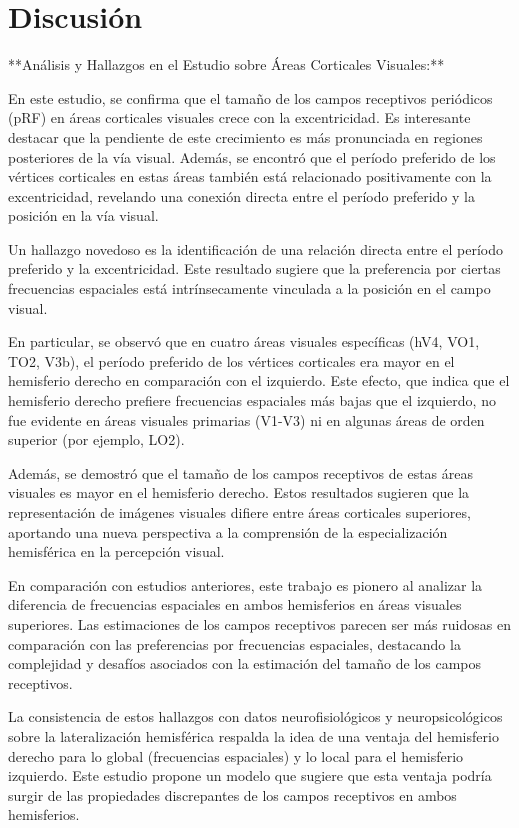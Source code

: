\chapter{Discusi\'on}\label{chapter:discussion}

**Análisis y Hallazgos en el Estudio sobre Áreas Corticales Visuales:**

En este estudio, se confirma que el tamaño de los campos receptivos periódicos (pRF) en áreas corticales visuales crece con la excentricidad. Es interesante destacar que la pendiente de este crecimiento es más pronunciada en regiones posteriores de la vía visual. Además, se encontró que el período preferido de los vértices corticales en estas áreas también está relacionado positivamente con la excentricidad, revelando una conexión directa entre el período preferido y la posición en la vía visual.

Un hallazgo novedoso es la identificación de una relación directa entre el período preferido y la excentricidad. Este resultado sugiere que la preferencia por ciertas frecuencias espaciales está intrínsecamente vinculada a la posición en el campo visual.

En particular, se observó que en cuatro áreas visuales específicas (hV4, VO1, TO2, V3b), el período preferido de los vértices corticales era mayor en el hemisferio derecho en comparación con el izquierdo. Este efecto, que indica que el hemisferio derecho prefiere frecuencias espaciales más bajas que el izquierdo, no fue evidente en áreas visuales primarias (V1-V3) ni en algunas áreas de orden superior (por ejemplo, LO2).

Además, se demostró que el tamaño de los campos receptivos de estas áreas visuales es mayor en el hemisferio derecho. Estos resultados sugieren que la representación de imágenes visuales difiere entre áreas corticales superiores, aportando una nueva perspectiva a la comprensión de la especialización hemisférica en la percepción visual.

En comparación con estudios anteriores, este trabajo es pionero al analizar la diferencia de frecuencias espaciales en ambos hemisferios en áreas visuales superiores. Las estimaciones de los campos receptivos parecen ser más ruidosas en comparación con las preferencias por frecuencias espaciales, destacando la complejidad y desafíos asociados con la estimación del tamaño de los campos receptivos.

La consistencia de estos hallazgos con datos neurofisiológicos y neuropsicológicos sobre la lateralización hemisférica respalda la idea de una ventaja del hemisferio derecho para lo global (frecuencias espaciales) y lo local para el hemisferio izquierdo. Este estudio propone un modelo que sugiere que esta ventaja podría surgir de las propiedades discrepantes de los campos receptivos en ambos hemisferios.

